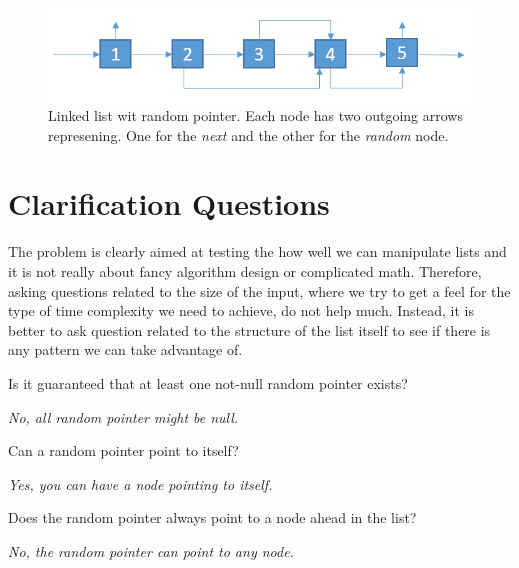\begin{figure}
	\label{fig:clone_list_random_pointer:list1}
	\centering
	\includegraphics[scale=0.6]{sources/clone_list_random_pointer/images/random_list_1}
	\caption{Linked list wit random pointer. Each node has two outgoing arrows represening. One for the \textit{next} and the other for the \textit{random} node.}
\end{figure}


\section{Clarification Questions}
The problem is clearly aimed at testing the how well we can manipulate lists and it is not really about fancy algorithm design or complicated math.
Therefore, asking questions related to the size of the input, where we try to get a feel for the type of time complexity we need to achieve, do not help much.
Instead, it is better to ask question related to the structure of the list itself to see if there is any pattern we can take advantage of.
\begin{QandA}
	\item \begin{questionitem} \begin{question} Is it guaranteed that at least one not-null random pointer exists?  \end{question} 	 
    \begin{answered}
		\textit{No, all random pointer might be null.}
	\end{answered} \end{questionitem}
	\item \begin{questionitem} \begin{question} Can a random pointer point to itself?  \end{question} 	 
    \begin{answered}
		\textit{Yes, you can have a node pointing to itself.}
	\end{answered} \end{questionitem}

	\item \begin{questionitem} \begin{question} Does the random pointer always point to a node ahead in the list?  \end{question} 	 
		\begin{answered}
			\textit{No, the random pointer can point to any node.}
		\end{answered} \end{questionitem}
	
\end{QandA}

